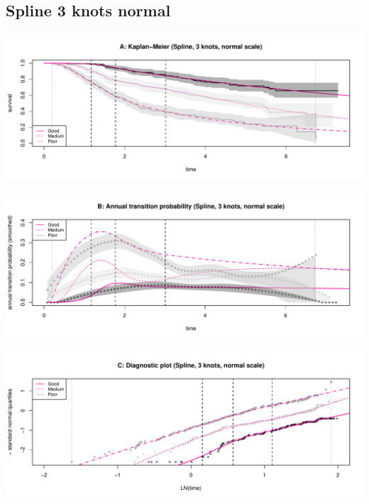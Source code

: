 \documentclass[
]{article}
\begin{document}
\hypertarget{spline-3-knots-normal}{%
\subsection{Spline 3 knots normal}\label{spline-3-knots-normal}}

\begin{flushleft}\includegraphics[height=0.25\textheight]{Images/spline_norm3-1} \end{flushleft}

\begin{flushleft}\includegraphics[height=0.25\textheight]{Images/spline_norm3-2} \end{flushleft}

\begin{flushleft}\includegraphics[height=0.25\textheight]{Images/spline_norm3-3} \end{flushleft}

\newpage
\end{document}
